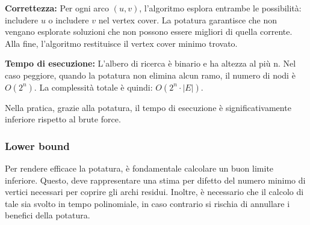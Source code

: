 \begin{algorithm}[H]
\DontPrintSemicolon
{}




\caption{Branch and Bound per Minimum Vertex Cover} 
\label{alg:branch_and_bound} 
\end{algorithm}

\textbf{Correttezza: } Per ogni arco $(u, v)$, l'algoritmo esplora entrambe le possibilità: includere $u$ o includere $v$ nel vertex cover. La potatura garantisce che non vengano esplorate soluzioni che non possono essere migliori di quella corrente. Alla fine, l'algoritmo restituisce il vertex cover minimo trovato.

\textbf{Tempo di esecuzione: } L'albero di ricerca è binario e ha altezza al più n. Nel caso peggiore, quando la potatura non elimina alcun ramo, il numero di nodi è $O(2^n)$. La complessità totale è quindi: $O(2^n \cdot |E|)$.

Nella pratica, grazie alla potatura, il tempo di esecuzione è significativamente inferiore rispetto al brute force.

\subsubsection{Lower bound}
Per rendere efficace la potatura, è fondamentale calcolare un buon limite inferiore. 
Questo, deve rappresentare una stima per difetto del numero minimo di vertici necessari per coprire gli archi residui. 
Inoltre, è necessario che il calcolo di tale sia svolto in tempo polinomiale, in caso contrario si rischia di annullare i benefici della potatura.

